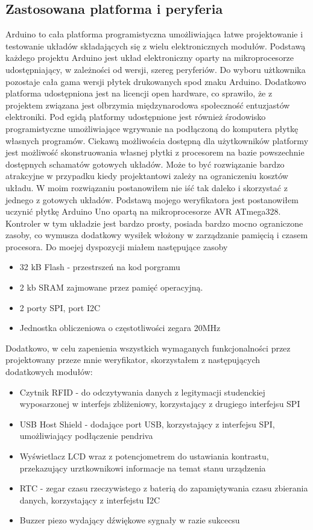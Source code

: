 \documentclass[declaration,shortabstract, mgr]{iithesis}
\begin{document}
\subsection{Zastosowana platforma i peryferia}
\indent Arduino to cała platforma programistyczna umożliwiająca łatwe projektowanie i testowanie układów składających się z wielu elektronicznych modułów. Podstawą każdego projektu Arduino jest układ elektroniczny oparty na mikroprocesorze udostępniający, w zależności od wersji, szereg peryferiów. Do wyboru użtkownika pozostaje cała gama wersji płytek drukowanych spod znaku Arduino. Dodatkowo platforma udostępniona jest na licencji open hardware, co sprawiło, że z projektem związana jest olbrzymia międzynarodowa społeczność entuzjastów elektroniki. Pod egidą platformy udostępnione jest również środowisko programistyczne umożliwiające wgrywanie na podłączoną do komputera płytkę własnych programów.
\indent Ciekawą możliwościa dostępną dla użytkowników platformy jest możliwość skonstruowania własnej płytki z procesorem na bazie powszechnie dostępnych schamatów gotowych układów. Może to być rozwiązanie bardzo atrakcyjne w przypadku kiedy projektantowi zależy na ograniczeniu kosztów układu. W moim rozwiązaniu postanowiłem nie iść tak daleko i skorzystać z jednego z gotowych układów.
\indent Podstawą mojego weryfikatora jest postanowiłem uczynić płytkę Arduino Uno opartą na mikroprocesorze AVR ATmega328. Kontroler w tym układzie jest bardzo prosty, posiada bardzo mocno ograniczone zasoby, co wymusza dodatkowy wysiłek włożony w zarządzanie pamięcią i czasem procesora. Do moejej dyspozycji miałem następujące zasoby\\
\begin{itemize}
\item 32 kB Flash - przestrszeń na kod porgramu
\item 2 kb SRAM zajmowane przez pamięć operacyjną.
\item 2 porty SPI, port I2C
\item Jednostka obliczeniowa o częstotliwości zegara 20MHz
\end{itemize}
\indent Dodatkowo, w celu zapenienia wszystkich wymaganych funkcjonalności przez projektowany przeze mnie weryfikator, skorzystałem z następujących dodatkowych modułów:
\begin{itemize}
\item Czytnik RFID - do odczytywania danych z legitymacji studenckiej wyposarzonej w interfejs zbliżeniowy, korzystający z drugiego interfejsu SPI
\item USB Host Shield - dodające port USB, korzystający z interfejsu SPI, umożliwiający podłączenie pendriva
\item Wyświetlacz LCD wraz z  potencjometrem do ustawiania kontrastu, przekazujący urztkownikowi informacje na temat stanu urządzenia
\item RTC - zegar czasu rzeczywistego z baterią do zapamiętywania czasu zbierania danych, korzystający z interfejstu I2C
\item Buzzer piezo wydający dźwiękowe sygnały w razie sukcecsu
\end{itemize}
\end{document}
